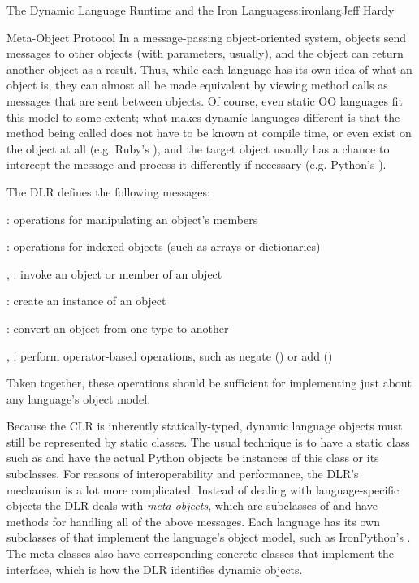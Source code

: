 \begin{aosachapter}{The Dynamic Language Runtime and the Iron Languages}{s:ironlang}{Jeff Hardy}
\begin{aosasect1}{Meta-Object Protocol}
In a message-passing object-oriented system, objects send messages to other
objects (with parameters, usually), and the object can return another object as
a result. Thus, while each language has its own idea of what an object is, they
can almost all be made equivalent by viewing method calls as messages that are
sent between objects. Of course, even static OO languages fit this model to
some extent; what makes dynamic languages different is that the method being
called does not have to be known at compile time, or even exist on the object
at all (e.g. Ruby's ), and the target object usually has
a chance to intercept the message and process it differently if necessary (e.g.
Python's ).

The DLR defines the following messages:

\begin{aosaitemize}

\item {}: operations for manipulating an object's
members

\item {}: operations for indexed objects (such as
arrays or dictionaries)

\item {}, : invoke an object or member of an
object

\item {}: create an instance of an object

\item {}: convert an object from one type to another

\item {}, : perform operator-based
operations, such as negate (\code{!}) or add (\code{+})

\end{aosaitemize}

Taken together, these operations should be sufficient for implementing just
about any language's object model.

Because the CLR is inherently statically-typed, dynamic language objects must
still be represented by static classes. The usual technique is to have a static
class such as  and have the actual Python objects be
instances of this class or its subclasses. For reasons of interoperability and
performance, the DLR's mechanism is a lot more complicated. Instead of dealing
with language-specific objects the DLR deals with \emph{meta-objects}, which
are subclasses of  and have methods for
handling all of the above messages. Each language has its own subclasses of
 that implement the language's object model, such as
IronPython's . The meta classes also have corresponding
concrete classes that implement the
 interface, which is how the
DLR identifies dynamic objects. 


\end{aosasect1}
\end{aosachapter}

